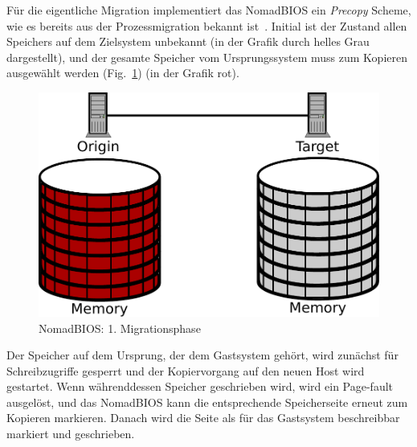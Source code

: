 Für die eigentliche Migration implementiert das NomadBIOS ein
\emph{Precopy} Scheme, wie es bereits aus der Prozessmigration bekannt
ist~\cite{hansen2002nomadic}. Initial ist der Zustand allen Speichers
auf dem Zielsystem unbekannt (in der Grafik durch helles Grau
dargestellt), und der gesamte Speicher vom Ursprungssystem muss zum
Kopieren ausgewählt werden (Fig.~\ref{fig:nomad_stage1}) (in der
Grafik rot).
\begin{figure}[tb]
  \centering
  \includegraphics[width=0.7\linewidth]{images/nomad_stage1}
  \caption{NomadBIOS: 1. Migrationsphase}
  \label{fig:nomad_stage1}
\end{figure}
Der Speicher auf dem Ursprung, der dem Gastsystem gehört, wird
zunächst für Schreibzugriffe gesperrt und der Kopiervorgang auf den
neuen Host wird gestartet. Wenn währenddessen Speicher geschrieben
wird, wird ein Page-fault ausgelöst, und das NomadBIOS kann die
entsprechende Speicherseite erneut zum Kopieren markieren. Danach wird
die Seite als für das Gastsystem beschreibbar markiert und
geschrieben.

